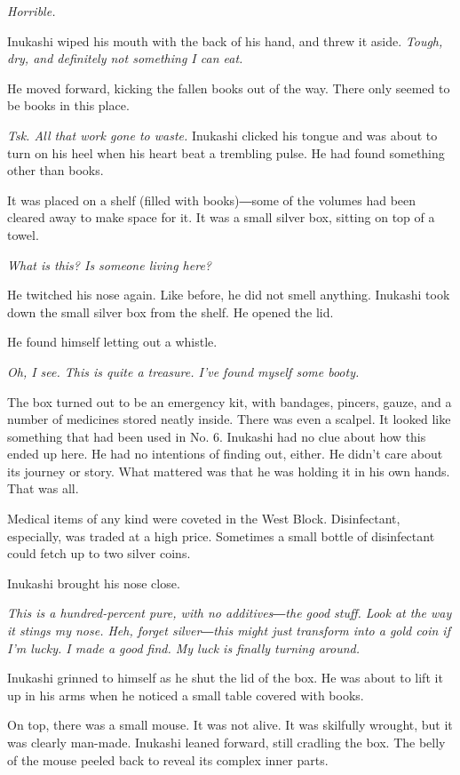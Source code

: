\emph{Horrible.}

Inukashi wiped his mouth with the back of his hand, and threw it aside.
\emph{Tough, dry, and definitely not something I can eat.}

He moved forward, kicking the fallen books out of the way. There only
seemed to be books in this place.

\emph{Tsk. All that work gone to waste.} Inukashi clicked his tongue and was
about to turn on his heel when his heart beat a trembling pulse. He had
found something other than books.

It was placed on a shelf (filled with books)―some of the volumes had
been cleared away to make space for it. It was a small silver box,
sitting on top of a towel.

\mybreak

\emph{What is this? Is someone living here?}

He twitched his nose again. Like before, he did not smell anything.
Inukashi took down the small silver box from the shelf. He opened the
lid.

He found himself letting out a whistle.

\emph{Oh, I see. This is quite a treasure. I've found myself some booty.}

The box turned out to be an emergency kit, with bandages, pincers,
gauze, and a number of medicines stored neatly inside. There was even a
scalpel. It looked like something that had been used in No. 6. Inukashi
had no clue about how this ended up here. He had no intentions of
finding out, either. He didn't care about its journey or story. What
mattered was that he was holding it in his own hands. That was all.

Medical items of any kind were coveted in the West Block. Disinfectant,
especially, was traded at a high price. Sometimes a small bottle of
disinfectant could fetch up to two silver coins.

Inukashi brought his nose close.

\emph{This is a hundred-percent pure, with no additives―the good stuff. Look
at the way it stings my nose. Heh, forget silver―this might just
transform into a gold coin if I'm lucky. I made a good find. My luck is
finally turning around.}

Inukashi grinned to himself as he shut the lid of the box. He was about
to lift it up in his arms when he noticed a small table covered with
books.

On top, there was a small mouse. It was not alive. It was skilfully
wrought, but it was clearly man-made. Inukashi leaned forward, still
cradling the box. The belly of the mouse peeled back to reveal its
complex inner parts.

